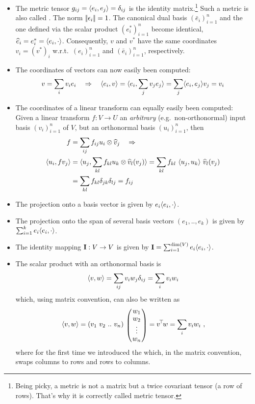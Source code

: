 \begin{itemize}
\item
The metric tensor $g_{ij} = \langle e_i,e_j\rangle = \delta_{ij}$ is the identity
matrix.\footnote{Being picky, a metric is not a matrix but a twice
covariant tensor (a row of rows). That's why it is correctly called
metric tensor.} Such a metric is also called . The
norm $|\!|\epsilon_i|\!| = 1$. The canonical dual basis $(\bar e_i)_{i=1}^n$ and
the one defined via the scalar product $(e^*_i)_{i=1}^n$ become identical,
$\widehat e_i = e^*_i = \langle e_i,\cdot\rangle$. Consequently, $v$ and $v^*$ have
the same coordinates $v_i = (v^*)_i$ w.r.t.\ $(e_i)_{i=1}^n$ and
$(\bar e_i)_{i=1}^n$, respectively.

\item The coordinates of vectors can now easily been computed:
\begin{align}
v = \sum_i v_i e_i \quad\Rightarrow\quad
\langle e_i,v\rangle = \langle e_i, \sum_j v_j e_j\rangle = \sum_j \langle e_i,e_j\rangle v_j = v_i
\end{align}

\item The coordinates of a linear transform can equally easily been computed:
Given a linear transform $f: V\to U$ an \emph{arbitrary} (e.g.\
non-orthonormal) input basis $(v_i)_{i=1}^n$ of $V$, but an orthonormal
basis $(u_i)_{i=1}^n$, then
\begin{align}
f &= \sum_{ij} f_{ij} u_i \otimes \widehat v_j
\quad\Rightarrow\\
\langle u_i, f v_j\rangle
&= \langle u_j, \sum_{kl} f_{kl} u_k \otimes \widehat v_l(v_j)\rangle
 = \sum_{kl} f_{kl}~ \langle u_j,u_k\rangle~ \widehat v_l(v_j) \nonumber \\
&= \sum_{kl} f_{kl} \delta_{jk} \delta_{lj} = f_{ij}
\end{align}

\item The projection onto a basis vector is given by $e_i \langle e_i,\cdot\rangle$.

\item The projection onto the span of several basis vectors $(e_1,..,e_k)$
is given by $\sum_{i=1}^k e_i \langle e_i,\cdot\rangle$.

\item The identity mapping ${\rm\bf I}:V \to V$ is given by ${\rm\bf I} = \sum_{i=1}^{\dim(V)} e_i \langle e_i,\cdot\rangle$.

\item The scalar product with an orthonormal basis is
\begin{equation}
\langle v,w\rangle = \sum_{ij} v_i w_j \delta_{ij} = \sum_i v_i w_i
\end{equation}
which, using matrix convention, can also be written as
\begin{equation}
\<v,w\>
 = (v_1~ v_2~ ..~ v_n)~
 \mat{c}{w_1 \\ w_2 \\ \vdots \\ w_n}
 = v^\T w = \sum_i v_i w_i ~,
\end{equation}
where for the first time we introduced the  which, in
the matrix convention, swaps columns to rows and rows to columns.
\end{itemize}

